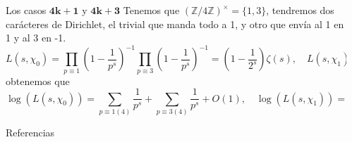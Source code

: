 \documentclass[final]{beamer}
\newcommand\Z{\ensuremath{\mathbb{Z}}}
\newlength{\sepwidth}
\newlength{\colwidth}
\newcommand{\separatorcolumn}{\begin{column}{\sepwidth}\end{column}}
\begin{document}
\begin{frame}[t,fragile]
\begin{columns}[t]
\begin{column}{\colwidth}
\begin{exampleblock}{Los casos $\mathbf{4k+1}$ y $\mathbf{4k+3}$}
    Tenemos que $(\Z/4\Z)^{\times}=\{1,3\}$, tendremos dos carácteres de Dirichlet, el trivial que manda todo a 1, y otro que envía al 1 en 1 y al 3 en -1.
    $$
L\left(s, \chi_0\right) =\prod_{p \equiv 1}\left(1-\frac{1}{p^s}\right)^{-1} \prod_{p \equiv 3}\left(1-\frac{1}{p^s}\right)^{-1}=\left(1-\frac{1}{2^s}\right) \zeta(s), \quad L\left(s, \chi_1\right)=\sum_{n=1}^{\infty} \frac{\chi_1(n)}{n^s}=\sum_{n=0}^{\infty}\frac{(-1)^n}{(2 n+1)^s},
$$
obtenemos que 
$$
\log \left(L\left(s, \chi_0\right)\right)=\sum_{p \equiv 1(4)} \frac{1}{p^s}+\sum_{p \equiv 3(4)} \frac{1}{p^s}+O(1), \quad 
\log \left(L\left(s, \chi_1\right)\right)=\sum_{p \equiv 1(4)} \frac{1}{p^s}-\sum_{p \equiv 3(4)} \frac{1}{p^s}+O(1)
$$
\end{exampleblock}

\begin{block}{Referencias}
\nocite{*}
\footnotesize{}
\end{block}
\end{column}
\separatorcolumn



\end{columns}
\end{frame}
\end{document}
